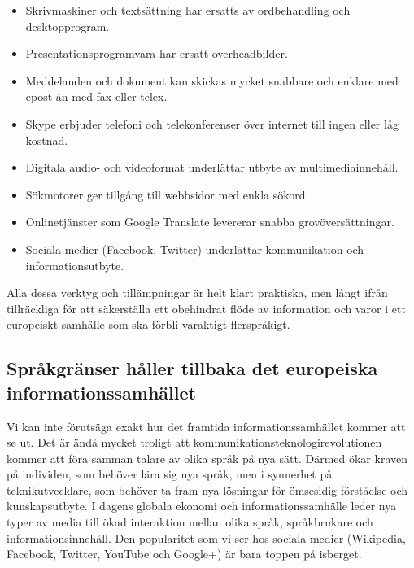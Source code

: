 \begin{multicols}{2}
\begin{itemize}
\item Skrivmaskiner och textsättning har ersatts av ordbehandling och
  desktopprogram.
\item Presentations\-programvara har ersatt over\-head\-bilder.
\item Meddelanden och dokument kan skickas mycket snabbare och enklare
  med epost än med fax eller telex.
\item Skype erbjuder telefoni och telekonferenser över internet till
  ingen eller låg kostnad.
\item Digitala audio- och videoformat underlättar utbyte av
  multi\-media\-innehåll.
\item Sökmotorer ger tillgång till webbsidor med enkla sökord.
\item Online\-tjänster som Google Translate levererar snabba
  grovöversättningar.
\item Sociala medier (Facebook, Twitter) underlättar kommunika\-tion
  och informations\-utbyte.
\end{itemize}

Alla dessa verktyg och tillämpningar är helt klart praktiska, men
långt ifrån tillräckliga för att säkerställa ett obehindrat flöde av
information och varor i ett europeiskt samhälle som ska förbli
varaktigt flerspråkigt.

\subsection{Språkgränser håller tillbaka det europe\-iska informa\-tions\-sam\-hället}
  
Vi kan inte förutsäga exakt hur det framtida in\-forma\-tions\-samhället
kommer att se ut. Det är ändå mycket troligt att
kom\-munika\-tions\-tekno\-logi\-revolu\-tion\-en kommer att föra
samman talare av olika språk på nya sätt. Därmed ökar kraven på
individen, som behöver lära sig nya språk, men i synnerhet på
teknik\-ut\-vecklare, som behöver ta fram nya lösningar för ömsesidig
förståelse och kunskapsutbyte. I dagens globala ekonomi och informationssamhälle leder nya typer av
media till ökad interaktion mellan olika språk, språk\-brukare och
informationsinnehåll. Den popularitet som vi ser hos sociala medier
(Wikipedia, Facebook, Twitter, YouTube och Google+) är bara toppen på
isberget.




\end{multicols}
